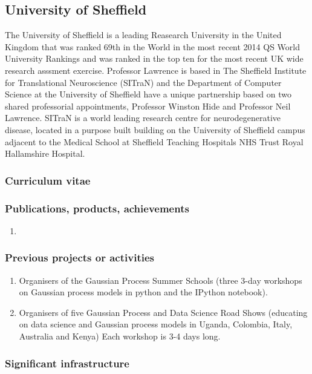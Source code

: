 \subsection*{University of Sheffield}


The University of Sheffield is a leading Reasearch University in the
United Kingdom that was ranked 69th in the World in the most recent
2014 QS World University Rankings and was ranked in the top ten for
the most recent UK wide research asssment exercise.  Professor
Lawrence is based in The Sheffield Institute for Translational
Neuroscience (SITraN) and the Department of Computer Science at the
University of Sheffield have a unique partnership based on two shared
professorial appointments, Professor Winston Hide and Professor Neil
Lawrence.  SITraN is a world leading research centre for
neurodegenerative disease, located in a purpose built building on the
University of Sheffield campus adjacent to the Medical School at
Sheffield Teaching Hospitals NHS Trust Royal Hallamshire Hospital. 

\subsubsection*{Curriculum vitae}



%
%

\subsubsection*{Publications, products, achievements}

\begin{enumerate}
\item {}
\end{enumerate}

\subsubsection*{Previous projects or activities}

\begin{enumerate}
\item Organisers of the Gaussian Process Summer Schools (three 3-day workshops on Gaussian process models in python and the IPython notebook).
\item Organisers of five Gaussian Process and Data Science Road Shows (educating on data science and Gaussian process models in Uganda, Colombia, Italy, Australia and Kenya) Each workshop is 3-4 days long. 
\end{enumerate}

\subsubsection*{Significant infrastructure}

